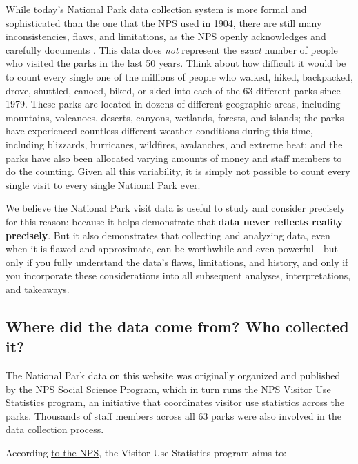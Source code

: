 \documentclass[
  letterpaper,
  DIV=11,
  numbers=noendperiod]{scrartcl}
\begin{document}
While today's National Park data collection system is more formal and
sophisticated than the one that the NPS used in 1904, there are still
many inconsistencies, flaws, and limitations, as the NPS
\href{https://www.nps.gov/subjects/socialscience/visitor-use-statistics-dashboard.htm}{openly
acknowledges} and carefully documents . This data does \emph{not}
represent the \emph{exact} number of people who visited the parks in the
last 50 years. Think about how difficult it would be to count every
single one of the millions of people who walked, hiked, backpacked,
drove, shuttled, canoed, biked, or skied into each of the 63 different
parks since 1979. These parks are located in dozens of different
geographic areas, including mountains, volcanoes, deserts, canyons,
wetlands, forests, and islands; the parks have experienced countless
different weather conditions during this time, including blizzards,
hurricanes, wildfires, avalanches, and extreme heat; and the parks have
also been allocated varying amounts of money and staff members to do the
counting. Given all this variability, it is simply not possible to count
every single visit to every single National Park ever.

We believe the National Park visit data is useful to study and consider
precisely for this reason: because it helps demonstrate that
\textbf{data never reflects reality precisely}. But it also demonstrates
that collecting and analyzing data, even when it is flawed and
approximate, can be worthwhile and even powerful---but only if you fully
understand the data's flaws, limitations, and history, and only if you
incorporate these considerations into all subsequent analyses,
interpretations, and takeaways.

\subsection{Where did the data come from? Who collected
it?}\label{where-did-the-data-come-from-who-collected-it}

The National Park data on this website was originally organized and
published by the
\href{https://www.nps.gov/subjects/socialscience/visitor-use-statistics.htm}{NPS
Social Science Program}, which in turn runs the NPS Visitor Use
Statistics program, an initiative that coordinates visitor use
statistics across the parks. Thousands of staff members across all 63
parks were also involved in the data collection process.

According
\href{https://www.nps.gov/subjects/socialscience/statistics-history.htm}{to
the NPS}, the Visitor Use Statistics program aims to:
\end{document}
